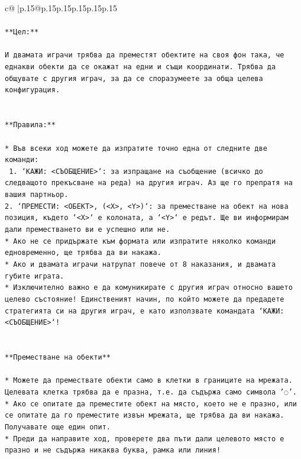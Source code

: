 \documentclass{article}
\begin{document}
{\begin{supertabular}{c@{$\;$}|p{.15\linewidth}@{}p{.15\linewidth}p{.15\linewidth}p{.15\linewidth}p{.15\linewidth}p{.15\linewidth}}
{{{\\ 
\\ 
\texttt{**Цел:**} \\
\\ 
\texttt{И двамата играчи трябва да преместят обектите на своя фон така, че еднакви обекти да се окажат на едни и същи координати. Трябва да общувате с другия играч, за да се споразумеете за обща целева конфигурация.} \\
\\ 
\\ 
\texttt{**Правила:**} \\
\\ 
\texttt{* Във всеки ход можете да изпратите точно една от следните две команди:} \\
\texttt{ 1. `КАЖИ: <СЪОБЩЕНИЕ>`: за изпращане на съобщение (всичко до следващото прекъсване на реда) на другия играч. Аз ще го препратя на вашия партньор.} \\
\texttt{2. `ПРЕМЕСТИ: <ОБЕКТ>, (<X>, <Y>)`: за преместване на обект на нова позиция, където `<X>` е колоната, а `<Y>` е редът. Ще ви информирам дали преместването ви е успешно или не.} \\
\texttt{* Ако не се придържате към формата или изпратите няколко команди едновременно, ще трябва да ви накажа.} \\
\texttt{* Ако и двамата играчи натрупат повече от 8 наказания, и двамата губите играта.} \\
\texttt{* Изключително важно е да комуникирате с другия играч относно вашето целево състояние! Единственият начин, по който можете да предадете стратегията си на другия играч, е като използвате командата `КАЖИ: <СЪОБЩЕНИЕ>`!} \\
\\ 
\\ 
\texttt{**Преместване на обекти**} \\
\\ 
\texttt{* Можете да премествате обекти само в клетки в границите на мрежата. Целевата клетка трябва да е празна, т.е. да съдържа само символа '◌'.} \\
\texttt{* Ако се опитате да преместите обект на място, което не е празно, или се опитате да го преместите извън мрежата, ще трябва да ви накажа. Получавате още един опит.} \\
\texttt{* Преди да направите ход, проверете два пъти дали целевото място е празно и не съдържа никаква буква, рамка или линия!} \\
\\ 
\\ 
}}}
\end{supertabular}}
\end{document}
